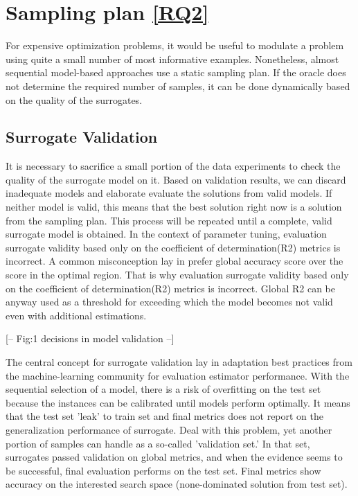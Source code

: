     \section{Sampling plan \ref{RQ2}}
        For expensive optimization problems, it would be useful to modulate a problem using quite a small number of most informative examples. Nonetheless, almost sequential model-based approaches use a static sampling plan. If the oracle does not determine the required number of samples, it can be done dynamically based on the quality of the surrogates. 

        \subsection{Surrogate Validation}
        It is necessary to sacrifice a small portion of the data experiments to check the quality of the surrogate model on it. Based on validation results, we can discard inadequate models and elaborate evaluate the solutions from valid models. If neither model is valid, this means that the best solution right now is a solution from the sampling plan. This process will be repeated until a complete, valid surrogate model is obtained.
        In the context of parameter tuning, evaluation surrogate validity based only on the coefficient of determination(R2) metrics is incorrect. A common misconception lay in prefer global accuracy score over the score in the optimal region. That is why evaluation surrogate validity based only on the coefficient of determination(R2) metrics is incorrect\cite{nardi2019practical}. Global R2 can be anyway used as a threshold for exceeding which the model becomes not valid even with additional estimations.  

                                            [-- Fig:1   decisions in model validation   --]

        The central concept for surrogate validation lay in adaptation best practices from the machine-learning community for evaluation estimator performance.  
        With the sequential selection of a model, there is a risk of overfitting on the test set because the instances can be calibrated until models perform optimally. It means that the test set 'leak' to train set and final metrics does not report on the generalization performance of surrogate. Deal with this problem, yet another portion of samples can handle as a so-called 'validation set.' In that set, surrogates passed validation on global metrics, and when the evidence seems to be successful, final evaluation performs on the test set. Final metrics show accuracy on the interested search space (none-dominated solution from test set).

